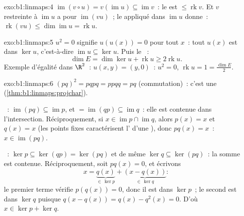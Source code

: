 \begin{solution}{exo:b1:linmaps:4}
$\operatorname{im}(v \circ u) = v(\operatorname{im} u) \subseteq
\operatorname{im} v$~: le  est $\leq \operatorname{rk} v$. Et $v$
restreinte à $\operatorname{im} u$ a pour 
$\operatorname{im}(vu)$~; le  appliqué dans
$\operatorname{im} u$ donne~: $\operatorname{rk}(vu) \leq
\dim\operatorname{im} u = \operatorname{rk} u$.
\end{solution}

\begin{solution}{exo:b1:linmaps:5}
$u^2 = 0$ signifie $u(u(x)) = 0$ pour tout $x$~: tout $u(x)$ est dans
$\ker u$, c'est-à-dire $\operatorname{im} u \subseteq \ker u$. Puis le
~:
\[
\dim E = \dim\ker u + \operatorname{rk} u \geq 2\operatorname{rk} u .
\]
Exemple d'égalité dans $\R^2$~: $u(x, y) = (y, 0)$~: $u^2 = 0$,
$\operatorname{rk} u = 1 = \frac{\dim E}{2}$.
\end{solution}

\begin{solution}{exo:b1:linmaps:6}
$(pq)^2 = pqpq = ppqq = pq$ (commutation)~: c'est une 
(\cref{thm:b1:linmaps:projchar}).

~: $\operatorname{im}(pq) \subseteq \operatorname{im} p$, et
$= \operatorname{im}(qp) \subseteq \operatorname{im} q$~: elle est contenue
dans l'intersection. Réciproquement, si $x \in \operatorname{im} p \cap
\operatorname{im} q$, alors $p(x) = x$ et $q(x) = x$ (les points fixes
caractérisent l' d'une ), donc $pq(x) = x$~: $x \in
\operatorname{im}(pq)$.

~: $\ker p \subseteq \ker(qp) = \ker(pq)$ et de même $\ker q
\subseteq \ker(pq)$~: la somme est contenue. Réciproquement, soit $pq(x) =
0$, et écrivons
\[
x = \underbrace{q(x)}_{\in\, \ker p} +
\underbrace{(x - q(x))}_{\in\, \ker q} :
\]
le premier terme vérifie $p(q(x)) = 0$, donc il est dans $\ker p$~; le
second est dans $\ker q$ puisque $q(x - q(x)) = q(x) - q^2(x) = 0$. D'où
$x \in \ker p + \ker q$.
\end{solution}

